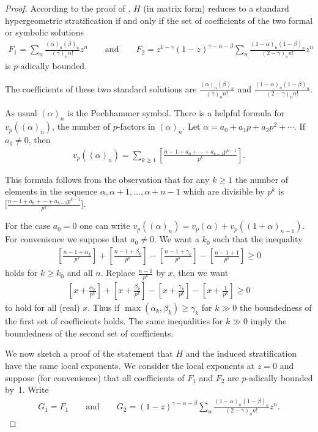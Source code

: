 \documentclass[10pt,a4paper]{amsart}
\numberwithin{equation}{section}
\begin{document}
 \begin{proof} According to the proof of \cite[Theorem~8.9]{Ma-vdP1}, $H$ (in matrix form) reduces to a standard hypergeometric stratification if and only if the set of coefficients of the two formal or symbolic solutions
 \begin{gather*}
 F_1=\sum _n \frac{(\alpha)_n(\beta)_n}{(\gamma)_nn!}z^n \qquad \text{and} \qquad F_2=z^{1-\gamma}(1-z)^{\gamma -\alpha -\beta} \sum _n\frac{(1-\alpha)_n(1-\beta )_n}{(2-\gamma)_nn!}z^n\end{gather*} is $p$-adically bounded.

 The coefficients of these two standard solutions are $\frac{(\alpha)_n(\beta)_n}{(\gamma)_nn!}$ and $\frac{(1-\alpha)_n(1-\beta )_n}{(2-\gamma)_nn!}$.

As usual $(\alpha )_n$ is the Pochhammer symbol. There is a helpful formula for $v_p((\alpha)_n)$, the number of $p$-factors in $(\alpha)_n$. Let $\alpha =a_0+a_1p+a_2p^2+\cdots $. If $a_0\neq 0$, then
\begin{gather*}
v_p((\alpha )_n)=\sum _{k\geq 1}\left[\frac{n-1+a_0+\cdots +a_{k-1}p^{k-1}}{p^k}\right] .\end{gather*}

This formula follows from the observation that for any $k\geq 1$ the number of elements in the sequence $\alpha, \alpha +1,\dots ,\alpha +n-1$ which are divisible by $p^k$ is $\big[\frac{n-1+a_0+\cdots +a_{k-1}p^{k-1}}{p^k}\big]$.

For the case $a_0=0$ one can write $v_p((\alpha)_n)=v_p(\alpha)+v_p((1+\alpha)_{n-1})$. For convenience we suppose that $a_0\neq 0$. We want a $k_0$ such that the inequality
\begin{gather*} \left[\frac{n-1+\alpha _k}{p^k}\right] + \left[\frac{n-1+\beta _k}{p^k}\right] -
\left[\frac{n-1+\gamma _k}{p^k}\right]- \left[\frac{n-1+1}{p^k}\right]\geq 0 \end{gather*}
 holds for $k\geq k_0$ and all $n$. Replace $\frac{n-1}{p^k}$ by $x$, then we want
\begin{gather*} \left[x+\frac{\alpha _k}{p^k}\right] + \left[x+\frac{\beta _k}{p^k}\right] -
\left[x+\frac{\gamma _k}{p^k}\right]- \left[x+\frac{1}{p^k}\right]\geq 0
\end{gather*}
to hold for all (real) $x$. Thus if $\max (\alpha _k,\beta _k)\geq \gamma_k$ for $k\gg 0$ the boundedness of the first set of coefficients holds. The same inequalities for $k\gg 0$ imply the boundedness of the second set of coefficients.

We now sketch a proof of the statement that $H$ and the induced stratification have the same local exponents. We consider the local exponents at $z=0$ and suppose (for convenience) that all coefficients of $F_1$ and $F_2$ are $p$-adically bounded by~1. Write
\begin{gather*} G_1=F_1 \qquad \text{and}\qquad G_2=(1-z)^{\gamma -\alpha -\beta}
 \sum _n\frac{(1-\alpha)_n(1-\beta )_n}{(2-\gamma)_nn!}z^n.\end{gather*}


\end{proof}
\end{document}
